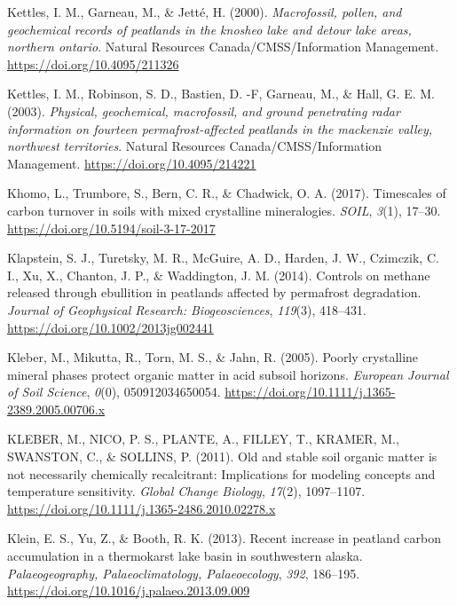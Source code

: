 \documentclass[]{article}
\begin{document}
\leavevmode\hypertarget{ref-Kettles_2000}{}%
Kettles, I. M., Garneau, M., \& Jetté, H. (2000). \emph{Macrofossil,
pollen, and geochemical records of peatlands in the knosheo lake and
detour lake areas, northern ontario}. Natural Resources
Canada/CMSS/Information Management. \url{https://doi.org/10.4095/211326}

\leavevmode\hypertarget{ref-Kettles_2003}{}%
Kettles, I. M., Robinson, S. D., Bastien, D. -F, Garneau, M., \& Hall,
G. E. M. (2003). \emph{Physical, geochemical, macrofossil, and ground
penetrating radar information on fourteen permafrost-affected peatlands
in the mackenzie valley, northwest territories}. Natural Resources
Canada/CMSS/Information Management. \url{https://doi.org/10.4095/214221}

\leavevmode\hypertarget{ref-Khomo_2017}{}%
Khomo, L., Trumbore, S., Bern, C. R., \& Chadwick, O. A. (2017).
Timescales of carbon turnover in soils with mixed crystalline
mineralogies. \emph{SOIL}, \emph{3}(1), 17--30.
\url{https://doi.org/10.5194/soil-3-17-2017}

\leavevmode\hypertarget{ref-Klapstein_2014}{}%
Klapstein, S. J., Turetsky, M. R., McGuire, A. D., Harden, J. W.,
Czimczik, C. I., Xu, X., Chanton, J. P., \& Waddington, J. M. (2014).
Controls on methane released through ebullition in peatlands affected by
permafrost degradation. \emph{Journal of Geophysical Research:
Biogeosciences}, \emph{119}(3), 418--431.
\url{https://doi.org/10.1002/2013jg002441}

\leavevmode\hypertarget{ref-Kleber_2005}{}%
Kleber, M., Mikutta, R., Torn, M. S., \& Jahn, R. (2005). Poorly
crystalline mineral phases protect organic matter in acid subsoil
horizons. \emph{European Journal of Soil Science}, \emph{0}(0),
050912034650054. \url{https://doi.org/10.1111/j.1365-2389.2005.00706.x}

\leavevmode\hypertarget{ref-KLEBER_2011}{}%
KLEBER, M., NICO, P. S., PLANTE, A., FILLEY, T., KRAMER, M., SWANSTON,
C., \& SOLLINS, P. (2011). Old and stable soil organic matter is not
necessarily chemically recalcitrant: Implications for modeling concepts
and temperature sensitivity. \emph{Global Change Biology}, \emph{17}(2),
1097--1107. \url{https://doi.org/10.1111/j.1365-2486.2010.02278.x}

\leavevmode\hypertarget{ref-Klein_2013}{}%
Klein, E. S., Yu, Z., \& Booth, R. K. (2013). Recent increase in
peatland carbon accumulation in a thermokarst lake basin in southwestern
alaska. \emph{Palaeogeography, Palaeoclimatology, Palaeoecology},
\emph{392}, 186--195. \url{https://doi.org/10.1016/j.palaeo.2013.09.009}
\end{document}
